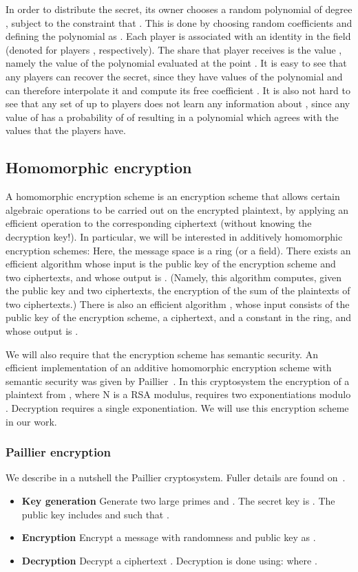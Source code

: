 \documentclass[10pt]{svjour3}
\begin{document}
In order to distribute the secret, its owner chooses a random
polynomial  of degree , subject to the constraint that
. This is done by choosing random coefficients
 and defining the polynomial as
. Each player is associated with an
identity in the field (denoted \/ for players
, respectively). The share that player  receives is the
value , namely the value of the polynomial evaluated at the
point .  It is easy to see that any  players can recover the
secret, since they have  values of the polynomial and can therefore
interpolate it and compute its free coefficient . It is also not
hard to see that any set of up to  players does not learn any
information about , since any value of  has a probability of
 of resulting in a polynomial which agrees with the values that
the players have.
\subsection{Homomorphic encryption}
A homomorphic encryption scheme is an encryption scheme that
allows certain algebraic operations to be carried out on the
encrypted plaintext, by applying an efficient operation to the
corresponding ciphertext (without knowing the decryption key!). In
particular, we will be interested in additively homomorphic
encryption schemes: Here, the message space is a ring (or a
field). There exists an efficient algorithm  whose input
is the public key of the encryption scheme and two ciphertexts,
and whose output is . (Namely, this algorithm computes, given the public key and
two ciphertexts, the encryption of the sum of the plaintexts of
two ciphertexts.) There is also an efficient algorithm
, whose input consists of the public key of the
encryption scheme, a ciphertext, and a constant  in the ring,
and whose output is  .

We will also  require that the encryption scheme has semantic
security. An efficient implementation of an additive homomorphic
encryption scheme with semantic security was given by
Paillier~\cite{Paillier}. In this cryptosystem the encryption of a
plaintext from , where N is a RSA modulus, requires two
exponentiations modulo . Decryption requires a single
exponentiation. We will use this encryption scheme in our work.

\subsubsection{Paillier encryption}
We describe in a nutshell the Paillier cryptosystem. Fuller
details are found on~\cite{Paillier}.
\begin{itemize}
    \item {\bf Key generation} Generate two large primes 
and . The secret key  is . The
public key  includes  and 
such that .
    \item {\bf Encryption} Encrypt a message  with randomness
 and public key  as .
    \item {\bf Decryption} Decrypt a ciphertext .
    Decryption is done using:  where .
\end{itemize}
\end{document}
